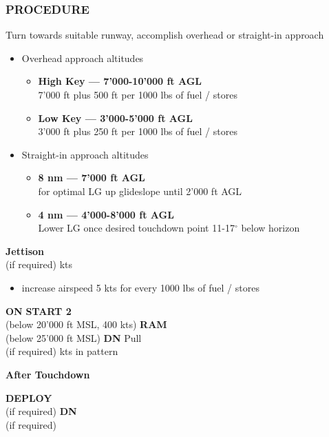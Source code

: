 \marginfigeometry

\subsubsection{PROCEDURE}

\begin{checklistenumerate}[start=0]

    Turn towards suitable runway, 
    accomplish overhead or straight-in approach
    \begin{itemize}
        \item Overhead approach altitudes
        \begin{itemize}
            \item \textbf{High Key --- 7'000-10'000 ft AGL} \\
            7'000 ft plus 500 ft per 1000 lbs of fuel / stores
            \item \textbf{Low Key --- 3'000-5'000 ft AGL}\\
            3'000 ft plus 250 ft per 1000 lbs of fuel / stores
        \end{itemize}
        \item Straight-in approach altitudes
        \begin{itemize}
            \item \textbf{8 nm --- 7'000 ft AGL}\\
            for optimal LG up glideslope until 2'000 ft AGL
            \item \textbf{4 nm --- 4'000-8'000 ft AGL}\\
            Lower LG once desired touchdown point 11-17$^\circ$ below horizon
        \end{itemize}
    \end{itemize}
    \blueitem[Stores]\dotfill \textbf{Jettison}\\
    \hfill(if required)
    \blueitem[Airspeed] kts
    \begin{itemize}
        \item increase airspeed 5 kts for every 1000 lbs of fuel / stores
    \end{itemize}
    \dotfill \textbf{ON}
    \dotfill \textbf{START 2}\\
    \hfill(below 20'000 ft MSL, 400 kts)
    \dotfill \textbf{RAM}\\
    \hfill(below 25'000 ft MSL)
    \blueitem[LG Handle]\dotfill \textbf{DN}
    \dotfill Pull\\
    \hfill(if required)
    \blueitem[Airspeed] kts in pattern
\end{checklistenumerate}
\textbf{After Touchdown}
\begin{checklistenumerate}[resume]
    \dotfill \textbf{DEPLOY}\\
    \hfill(if required)
    \dotfill \textbf{DN}\\
    \hfill(if required)
\end{checklistenumerate}

\clearpage

\marginfigrestore